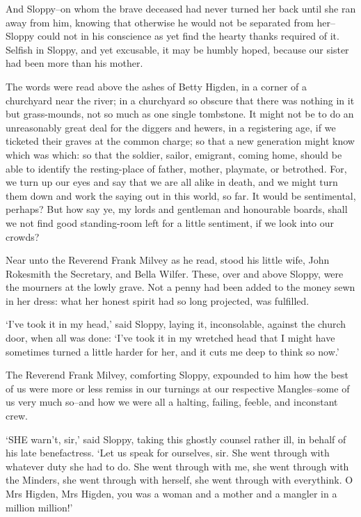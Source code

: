 And Sloppy--on whom the brave deceased had never turned her back until
she ran away from him, knowing that otherwise he would not be separated
from her--Sloppy could not in his conscience as yet find the hearty
thanks required of it. Selfish in Sloppy, and yet excusable, it may be
humbly hoped, because our sister had been more than his mother.

The words were read above the ashes of Betty Higden, in a corner of a
churchyard near the river; in a churchyard so obscure that there was
nothing in it but grass-mounds, not so much as one single tombstone.
It might not be to do an unreasonably great deal for the diggers and
hewers, in a registering age, if we ticketed their graves at the common
charge; so that a new generation might know which was which: so that the
soldier, sailor, emigrant, coming home, should be able to identify the
resting-place of father, mother, playmate, or betrothed. For, we turn up
our eyes and say that we are all alike in death, and we might turn
them down and work the saying out in this world, so far. It would
be sentimental, perhaps? But how say ye, my lords and gentleman and
honourable boards, shall we not find good standing-room left for a
little sentiment, if we look into our crowds?

Near unto the Reverend Frank Milvey as he read, stood his little wife,
John Rokesmith the Secretary, and Bella Wilfer. These, over and above
Sloppy, were the mourners at the lowly grave. Not a penny had been
added to the money sewn in her dress: what her honest spirit had so long
projected, was fulfilled.

‘I’ve took it in my head,’ said Sloppy, laying it, inconsolable, against
the church door, when all was done: ‘I’ve took it in my wretched head
that I might have sometimes turned a little harder for her, and it cuts
me deep to think so now.’

The Reverend Frank Milvey, comforting Sloppy, expounded to him how the
best of us were more or less remiss in our turnings at our respective
Mangles--some of us very much so--and how we were all a halting,
failing, feeble, and inconstant crew.

‘SHE warn’t, sir,’ said Sloppy, taking this ghostly counsel rather ill,
in behalf of his late benefactress. ‘Let us speak for ourselves, sir.
She went through with whatever duty she had to do. She went through with
me, she went through with the Minders, she went through with herself,
she went through with everythink. O Mrs Higden, Mrs Higden, you was a
woman and a mother and a mangler in a million million!’

